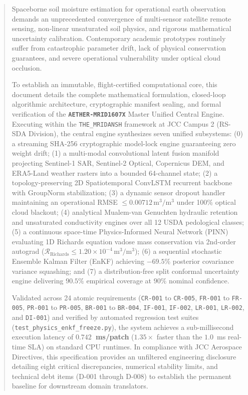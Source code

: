 \documentclass[11pt,a4paper]{article}
\theoremstyle{definition}
\theoremstyle{remark}
\begin{document}
\begin{abstract}
\noindent
Spaceborne soil moisture estimation for operational earth observation demands an unprecedented convergence of multi-sensor satellite remote sensing, non-linear unsaturated soil physics, and rigorous mathematical uncertainty calibration. Contemporary academic prototypes routinely suffer from catastrophic parameter drift, lack of physical conservation guarantees, and severe operational vulnerability under optical cloud occlusion.

To establish an immutable, flight-certified computational core, this document details the complete mathematical formulation, closed-loop algorithmic architecture, cryptographic manifest sealing, and formal verification of the \textbf{\texttt{AETHER-MRID1607X}} Master Unified Central Engine. Executing within the \texttt{THE\_MRIDANSH} framework at JCC Campus 2 (RS-SDA Division), the central engine synthesizes seven unified subsystems: (0) a streaming SHA-256 cryptographic model-lock engine guaranteeing zero weight drift; (1) a multi-modal convolutional latent fusion manifold projecting Sentinel-1 SAR, Sentinel-2 Optical, Copernicus DEM, and ERA5-Land weather rasters into a bounded 64-channel state; (2) a topology-preserving 2D Spatiotemporal ConvLSTM recurrent backbone with GroupNorm stabilization; (3) a dynamic sensor dropout handler maintaining an operational RMSE $\le 0.00712\,\text{m}^3/\text{m}^3$ under 100\% optical cloud blackout; (4) analytical Mualem-van Genuchten hydraulic retention and unsaturated conductivity engines over all 12 USDA pedological classes; (5) a continuous space-time Physics-Informed Neural Network (PINN) evaluating 1D Richards equation vadose mass conservation via 2nd-order autograd ($\mathcal{R}_{\text{Richards}} \le 1.20 \times 10^{-4}\,\text{m}^3/\text{m}^3$); (6) a sequential stochastic Ensemble Kalman Filter (EnKF) achieving $-69.5\%$ posterior covariance variance squashing; and (7) a distribution-free split conformal uncertainty engine delivering $90.5\%$ empirical coverage at $90\%$ nominal confidence.

Validated across 24 atomic requirements (\texttt{CR-001} to \texttt{CR-005}, \texttt{FR-001} to \texttt{FR-005}, \texttt{PR-001} to \texttt{PR-005}, \texttt{BR-001} to \texttt{BR-004}, \texttt{IF-001}, \texttt{IF-002}, \texttt{LR-001}, \texttt{LR-002}, and \texttt{DI-001}) and verified by automated regression test suites (\texttt{test\_physics\_enkf\_freeze.py}), the system achieves a sub-millisecond execution latency of \textbf{$0.742$~ms/patch} ($1.35\times$ faster than the $1.0$~ms real-time SLA) on standard CPU runtimes. In compliance with JCC Aerospace Directives, this specification provides an unfiltered engineering disclosure detailing eight critical discrepancies, numerical stability limits, and technical debt items (D-001 through D-008) to establish the permanent baseline for downstream domain translators.
\end{abstract}
\end{document}
